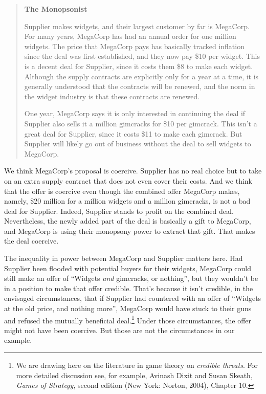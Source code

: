 \documentclass[
  11pt,
  letterpaper,
  DIV=11,
  numbers=noendperiod,
  twoside]{scrartcl}
\begin{document}
\begin{quote}
\textbf{The Monopsonist}

Supplier makes widgets, and their largest customer by far is MegaCorp.
For many years, MegaCorp has had an annual order for one million
widgets. The price that MegaCorp pays has basically tracked inflation
since the deal was first established, and they now pay \$10 per widget.
This is a decent deal for Supplier, since it costs them \$8 to make each
widget. Although the supply contracts are explicitly only for a year at
a time, it is generally understood that the contracts will be renewed,
and the norm in the widget industry is that these contracts are renewed.

One year, MegaCorp says it is only interested in continuing the deal if
Supplier also sells it a million gimcracks for \$10 per gimcrack. This
isn't a great deal for Supplier, since it costs \$11 to make each
gimcrack. But Supplier will likely go out of business without the deal
to sell widgets to MegaCorp.
\end{quote}

We think MegaCorp's proposal is coercive. Supplier has no real choice
but to take on an extra supply contract that does not even cover their
costs. And we think that the offer is coercive even though the combined
offer MegaCorp makes, namely, \$20 million for a million widgets and a
million gimcracks, is not a bad deal for Supplier. Indeed, Supplier
stands to profit on the combined deal. Nevertheless, the newly added
part of the deal is basically a gift to MegaCorp, and MegaCorp is using
their monopsony power to extract that gift. That makes the deal
coercive.

The inequality in power between MegaCorp and Supplier matters here. Had
Supplier been flooded with potential buyers for their widgets, MegaCorp
could still make an offer of ``Widgets \emph{and} gimcracks, or
nothing'', but they wouldn't be in a position to make that offer
credible. That's because it isn't credible, in the envisaged
circumstances, that if Supplier had countered with an offer of ``Widgets
at the old price, and nothing more'', MegaCorp would have stuck to their
guns and refused the mutually beneficial deal.\footnote{We are drawing
  here on the literature in game theory on \emph{credible threats}. For
  more detailed discussion see, for example, Avinash Dixit and Susan
  Skeath, \emph{Games of Strategy}, second edition (New York: Norton,
  2004), Chapter 10.} Under those circumstances, the offer might not
have been coercive. But those are not the circumstances in our example.
\end{document}
